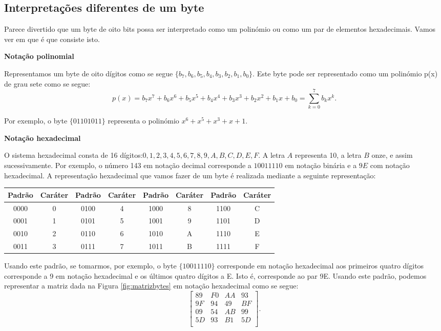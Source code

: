 \subsection{Interpretações diferentes de um byte}

Parece divertido que um byte de oito bits possa ser interpretado como um polinómio ou como um par de elementos hexadecimais. Vamos ver em que é que consiste isto. 

\begin{center}
\textbf{Notação polinomial}
\end{center}

Representamos um byte de oito dígitos como se segue $\{b_7, b_6,b_5,b_4,b_3,b_2,b_1,b_0\}$.  Este byte pode ser representado como um polinómio p(x) de grau sete como se segue:
\begin{equation}\label{eq:pol}
p(x)=b_7 x^7 +b_6 x^6+b_5 x^5+b_4 x^4+b_3 x^3+b_2 x^2+b_1 x+b_0=\sum_{k=0}^7 b_k x^k.
\end{equation}

Por exemplo, o byte $\{01101011\}$ representa o polinómio  $x^6+x^5+x^3+x+1$.

\begin{center}
\textbf{Notação hexadecimal}
\end{center}

O sistema hexadecimal consta de 16 dígitos:$0,1,2,3,4,5,6,7,8,9,A,B,C,D,E,F$. A letra $A$ representa 10, a letra $B$ onze, e assim sucessivamente. Por exemplo, o número 143 em notação decimal corresponde a $10011110$ em notação binária e a $9E$ com notação hexadecimal. A representação hexadecimal que vamos fazer de um byte é realizada mediante a seguinte representação:
\begin{center}
\begin{tabular}{|c|c||c|c||c|c||c|c|}\hline
Padrão & Caráter & Padrão & Caráter & Padrão & Caráter & Padrão & Caráter\\\hline
0000 & 0 & 0100 & 4 & 1000 & 8 & 1100 & C\\
0001 & 1 & 0101 & 5 & 1001 & 9 & 1101 & D\\
0010 & 2 & 0110 & 6 & 1010 & A & 1110 & E\\
0011 & 3 & 0111 & 7 & 1011 & B & 1111 & F\\\hline
\end{tabular}
\end{center}
Usando este padrão, se tomarmos, por exemplo, o byte  $\{10011110\}$	 corresponde em notação hexadecimal aos primeiros quatro dígitos corresponde a 9 em notação hexadecimal e os últimos quatro dígitos a E. Isto é, corresponde ao par 9E. Usando este padrão, podemos representar a matriz dada na Figura \ref{fig:matrizbytes} em notação hexadecimal como se segue:
$$\left[
\begin{array}{c|c|c|c}
89 & F0 & AA & 93\\\hline
9F & 94 & 49 & BF\\\hline
09 & 54 & AB & 99\\\hline
5D & 93 & B1 & 5D\\
\end{array}
\right].$$ 

